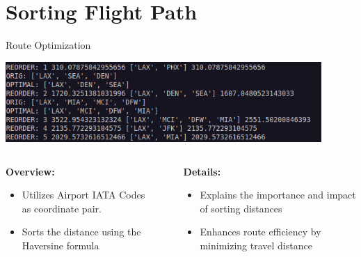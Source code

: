 \documentclass[aspectratio=169,xcolor=dvipsnames]{beamer}
\begin{document}
\section{Sorting Flight Path}

\begin{frame}{Route Optimization}
    \begin{minipage}[t]{\textwidth}
        \centering
        \includegraphics[width=0.9\textwidth, height=0.4\textheight]{images/sorting_output.png}
    \end{minipage}
    \vspace{0.5cm} %
    \begin{minipage}[t]{\textwidth}
        \begin{columns}[t]
            \begin{column}{0.45\textwidth}
            \centering
                \textbf{Overview:}
                \begin{itemize}
                    \item Utilizes Airport IATA Codes as coordinate pair.   
                    \item Sorts the distance using the Haversine formula
                \end{itemize}
            \end{column}
            \begin{column}{0.05\textwidth}
            \end{column}
            \begin{column}{0.5\textwidth}
            \centering
                \textbf{Details:}
                \begin{itemize}
                    \item Explains the importance and impact of sorting distances
                    \item Enhances route efficiency by minimizing travel distance
                \end{itemize}
            \end{column}
        \end{columns}
    \end{minipage}
\end{frame}
\end{document}
